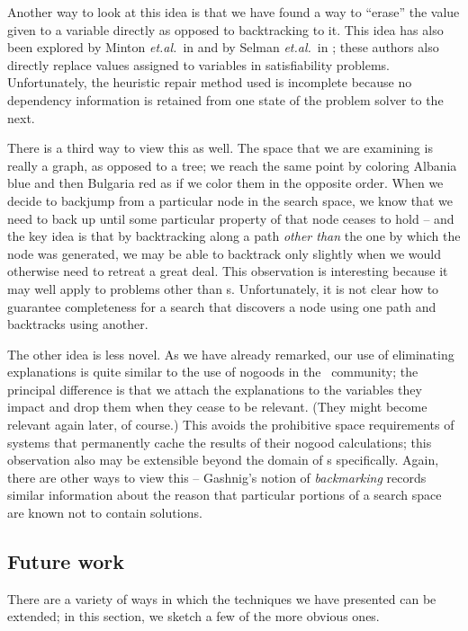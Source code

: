 Another way to look at this idea is that we have found a way to
``erase'' the value given to a variable directly as opposed to
backtracking to it.  This idea has also been explored by Minton {\em
et.al.}~in \cite{Minton:csp} and by Selman {\em et.al.}~in
\cite{Selman:GSAT}; these authors also directly replace values
assigned to variables in satisfiability problems.  Unfortunately, the
heuristic repair method used is incomplete because no dependency
information is retained from one state of the problem solver to the
next.

There is a third way to view this as well.  The space that we are
examining is really a graph, as opposed to a tree; we reach the same
point by coloring Albania blue and then Bulgaria red as if we color
them in the opposite order.  When we decide to backjump from a
particular node in the search space, we know that we need to back up
until some particular property of that node ceases to hold -- and the
key idea is that by backtracking along a path {\em other than\/} the
one by which the node was generated, we may be able to backtrack only
slightly when we would otherwise need to retreat a great deal.  This
observation is interesting because it may well apply to problems other
than \csp s.  Unfortunately, it is not clear how to guarantee
completeness for a search that discovers a node using one path and
backtracks using another.

The other idea is less novel.  As we have already remarked, our use of
eliminating explanations is quite similar to the use of nogoods in the
\atms\ community; the principal difference is that we attach the
explanations to the variables they impact and drop them when they
cease to be relevant.  (They might become relevant again later, of
course.)  This avoids the prohibitive space requirements of systems
that permanently cache the results of their nogood calculations; this
observation also may be extensible beyond the domain of \csp s
specifically.  Again, there are other ways to view this -- Gashnig's
notion of {\em backmarking} \cite{Gaschnig:bj} records similar
information about the reason that particular portions of a search
space are known not to contain solutions.

\subsection{Future work}

There are a variety of ways in which the techniques we have presented
can be extended; in this section, we sketch a few of the more obvious
ones.

